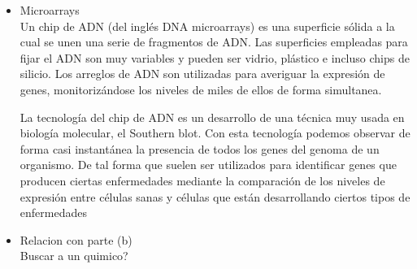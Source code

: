\begin{enumerate}
\begin{itemize}
\item Microarrays \\

Un chip de ADN (del inglés DNA microarrays) es una superficie sólida a la cual 
se unen una serie de fragmentos de ADN. Las superficies empleadas para fijar el 
ADN son muy variables y pueden ser vidrio, plástico e incluso chips de silicio. 
Los arreglos de ADN son utilizadas para averiguar la expresión de genes, 
monitorizándose los niveles de miles de ellos de forma simultanea.

La tecnología del chip de ADN es un desarrollo de una técnica muy usada en biología 
molecular, el Southern blot. Con esta tecnología podemos observar de forma casi
 instantánea la presencia de todos los genes del genoma de un organismo. De tal
 forma que suelen ser utilizados para identificar genes que producen ciertas 
enfermedades mediante la comparación de los niveles de expresión entre células
 sanas y células que están desarrollando ciertos tipos de enfermedades

\item Relacion con parte (b) \\

 Buscar a un quimico?

\end{itemize}


\end{enumerate}
